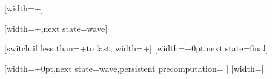 %
%
%



%
%
%
%


%

{
  [width=+\pgfdecorationsegmentlength]
  {
    \pgfpathmoveto{\pgfqpoint{0pt}{\pgfdecorationsegmentamplitude}}
    \pgfpathlineto{\pgfqpoint{0pt}{-\pgfdecorationsegmentamplitude}}
  }
  {
    \pgfpathmoveto{\pgfqpoint{0pt}{\pgfdecorationsegmentamplitude}}
    \pgfpathlineto{\pgfqpoint{0pt}{-\pgfdecorationsegmentamplitude}}
    \pgfpathmoveto{\pgfpointdecoratedpathlast}
  }
}



%

{
  [width=+\pgfdecorationsegmentlength,next state=wave]
  {}

  [switch if less than=+\pgfdecorationsegmentlength to last,
               width=+\pgfdecorationsegmentlength]
  {
    \pgfpathmoveto{
      \pgfpointadd
      {\pgfqpoint{-\pgfdecoratedcompleteddistance}{0pt}}%
      {\pgfpointpolar{\pgfdecorationsegmentangle}{+\pgfdecoratedcompleteddistance}}}%
    \pgfpatharc{\pgfdecorationsegmentangle}{-\pgfdecorationsegmentangle}{+\pgfdecoratedcompleteddistance}%
  }
  [width=+0pt,next state=final]
  {
    \pgfpathmoveto{
      \pgfpointadd
      {\pgfqpoint{-\pgfdecoratedcompleteddistance}{0pt}}%
      {\pgfpointpolar{\pgfdecorationsegmentangle}{+\pgfdecoratedcompleteddistance}}}%
    \pgfpatharc{\pgfdecorationsegmentangle}{-\pgfdecorationsegmentangle}{+\pgfdecoratedcompleteddistance}%
  }
  {
    \pgfpathmoveto{\pgfpointdecoratedpathlast}
  }
}



%

{
  [width=+0pt,next state=wave,persistent precomputation={
    \edef\pgf@lib@dec@ol{\pgfmathresult pt}
  }]{}  
  [width=\pgfdecorationsegmentlength]
  {
    \pgftransformxshift{+\pgfdecorationsegmentlength}
    \pgfpathmoveto{
      \pgfpointadd
      {\pgfqpoint{-\pgf@lib@dec@ol}{0pt}}%
      {\pgfpointpolar{\pgfdecorationsegmentangle}{+\pgf@lib@dec@ol}}}%
    \pgfpatharc{\pgfdecorationsegmentangle}{-\pgfdecorationsegmentangle}{+\pgf@lib@dec@ol}%
  }
  {
    \pgfpathmoveto{\pgfpointdecoratedpathlast}
  }
}



